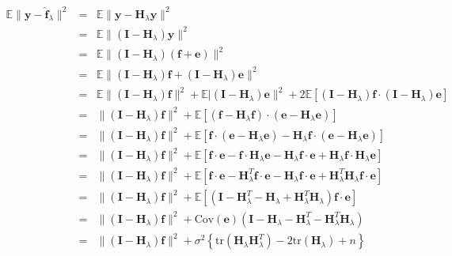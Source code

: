\documentclass[11pt]{article}
\newcommand{\EE}{\mathbb{E}}
\newcommand{\ff}{\boldsymbol{f}}
\newcommand{\Hl}{\boldsymbol{H}_\lambda}
\newcommand{\II}{\boldsymbol{I}}
\newcommand{\ee}{\boldsymbol{e}}
\newcommand{\yy}{\boldsymbol{y}}
\begin{document}
\begin{eqnarray*}
  \EE\lVert\yy-\hat{\mathbf{f}}_\lambda\rVert^2&=&\EE\lVert\yy-\Hl\yy\rVert^2\\
                                               &=&\EE\lVert\left(\II-\Hl\right)\yy\rVert^2\\
                                               &=&\EE\lVert\left(\II-\Hl\right)\left(\ff+\ee\right)\rVert^2\\
                                               &=&\EE\lVert\left(\II-\Hl\right)\ff+\left(\II-\Hl\right)\ee\rVert^2\\
                                               &=&\EE\lVert\left(\II-\Hl\right)\ff\rVert^2+\EE\lvert\left(\II-\Hl\right)\ee\rVert^2+2\EE\left[\left(\II-\Hl\right)\ff\cdot\left(\II-\Hl\right)\ee\right]\\
                                               &=&\lVert\left(\II-\Hl\right)\ff\rVert^2+\EE\left[\left(\ff-\Hl\ff\right)\cdot\left(\ee-\Hl\ee\right)\right]\\
                                               &=&\lVert\left(\II-\Hl\right)\ff\rVert^2+\EE\left[\ff\cdot\left(\ee-\Hl\ee\right)-\Hl\ff\cdot\left(\ee-\Hl\ee\right)\right]\\
                                               &=&\lVert\left(\II-\Hl\right)\ff\rVert^2+\EE\left[\ff\cdot\ee-\ff\cdot\Hl\ee-\Hl\ff\cdot\ee+\Hl\ff\cdot\Hl\ee\right]\\
                                               &=&\lVert\left(\II-\Hl\right)\ff\rVert^2+\EE\left[\ff\cdot\ee-\Hl^T\ff\cdot\ee-\Hl\ff\cdot\ee+\Hl^T\Hl\ff\cdot\ee\right]\\
                                               &=&\lVert\left(\II-\Hl\right)\ff\rVert^2+\EE\left[\left(\II-\Hl^T-\Hl+\Hl^T\Hl\right)\ff\cdot\ee\right]\\
                                               &=&\lVert\left(\II-\Hl\right)\ff\rVert^2+\textrm{Cov}\left(\ee\right)\left(\II-\Hl-\Hl^T-\Hl^T\Hl\right)\\
                                               &=&\lVert\left(\II-\Hl\right)\ff\rVert^2+\sigma^2\left\{\textrm{tr}\left(\Hl\Hl^T\right)-2\textrm{tr}\left(\Hl\right)+n\right\}
\end{eqnarray*}
\end{document}
